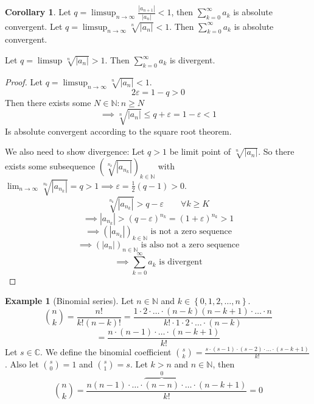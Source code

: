 \documentclass[a4paper,landscape,twocolumn]{article}
\theoremstyle{definition}
\newtheorem{ex}{Example}
\newtheorem{cor}{Corollary}
\newcommand\set[1]{\left\{#1\right\}}
\newcommand\abs[1]{\left|#1\right|}
\newcommand\seq[1]{{\left(#1\right)}_{n \in \mathbb N}}
\begin{document}
\begin{cor}
  Let $q = \limsup_{n\to\infty} \frac{\abs{a_{n+1}}}{\abs{a_n}} < 1$, then
  $\sum_{k=0}^\infty a_k$ is absolute convergent.
  Let $q = \limsup_{n\to\infty} \sqrt[n]{\abs{a_n}} < 1$.
  Then $\sum_{k=0}^\infty a_k$ is absolute convergent.

  Let $q = \limsup{\sqrt[n]{\abs{a_n}}} > 1$. Then $\sum_{k=0}^\infty a_k$ is divergent.
\end{cor}
\begin{proof}
  Let $q = \limsup_{n\to\infty} \sqrt[n]{\abs{a_n}} < 1$.
  \[ 2 \varepsilon = 1 - q > 0 \]
  Then there exists some $N \in \mathbb N: n \geq N$
  \[ \implies \sqrt[n]{\abs{a_n}} \leq q + \varepsilon = 1 - \varepsilon < 1 \]
  Is absolute convergent according to the square root theorem.

  We also need to show divergence: Let $q > 1$ be limit point of $\sqrt[n]{\abs{a_n}}$.
  So there exists some subsequence $\left(\sqrt[n_k]{\abs{a_{n_k}}}\right)_{k \in \mathbb N}$
  with $\lim_{n\to\infty} \sqrt[n_k]{\abs{a_{n_k}}} = q > 1 \implies \varepsilon = \frac12 \left(q - 1\right)
  > 0$.
  \[ \sqrt[n_k]{\abs{a_{n_k}}} > q - \varepsilon \qquad \forall k \geq K \]
  \[ \implies \abs{a_{n_k}} > (q - \varepsilon)^{n_k} = (1 + \varepsilon)^{n_k} > 1 \]
  \[ \implies \left(\abs{a_{n_k}}\right)_{k\in\mathbb N} \text{ is not a zero sequence} \]
  \[ \implies \seq{\abs{a_n}} \text{ is also not a zero sequence} \]
  \[ \implies \sum_{k=0}^\infty a_k \text{ is divergent} \]
\end{proof}

\begin{ex}[Binomial series]
  Let $n \in \mathbb N$ and $k \in \set{0,1,2,\dots,n}$.
  \[
    {n \choose k}
    = \frac{n!}{k! (n-k)!}
    = \frac{1 \cdot 2 \cdot \ldots \cdot (n-k)(n-k+1) \cdot \dots \cdot n}{k! \cdot 1 \cdot 2 \cdot \ldots \cdot (n-k)}
  \] \[
    = \frac{n \cdot (n-1) \cdot \ldots \cdot (n-k+1)}{k!}
  \]
  Let $s \in \mathbb C$. We define the binomial coefficient ${s \choose k}
  = \frac{s \cdot (s-1) \cdot (s-2) \cdot \ldots \cdot (s-k+1)}{k!}$.
  Also let ${s \choose 0} = 1$ and ${s \choose 1} = s$.
  Let $k > n$ and $n \in \mathbb N$, then
  \[ {n \choose k} = \frac{n (n-1) \cdot \ldots \cdot \overbrace{(n-n)}^{0} \cdot \ldots \cdot (n-k+1)}{k!} = 0 \]
\end{ex}
\end{document}

